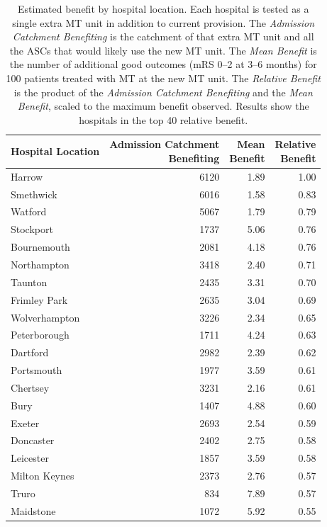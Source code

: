 \begin{table}[H]
\centering
\small
\caption{Estimated benefit by hospital location. Each hospital is tested as a single extra MT unit in addition to current provision. The \textit{Admission Catchment Benefiting} is the catchment of that extra MT unit and all the ASCs that would likely use the new MT unit. The \textit{Mean Benefit} is the number of additional good outcomes (mRS 0--2 at 3--6 months) for 100 patients treated with MT at the new MT unit. The \textit{Relative Benefit} is the product of the \textit{Admission Catchment Benefiting} and the \textit{Mean Benefit}, scaled to the maximum benefit observed. Results show the hospitals in the top 40 relative benefit.}
\label{tab:hospital-benefit}
\begin{tabular}{lrrr}
\toprule
Hospital Location & \shortstack[r]{Admission Catchment\\Benefiting} & \shortstack[r]{Mean\\Benefit} & \shortstack[r]{Relative\\Benefit} \\
\midrule
Harrow & 6120 & 1.89 & 1.00 \\
Smethwick & 6016 & 1.58 & 0.83 \\
Watford & 5067 & 1.79 & 0.79 \\
Stockport & 1737 & 5.06 & 0.76 \\
Bournemouth & 2081 & 4.18 & 0.76 \\
Northampton & 3418 & 2.40 & 0.71 \\
Taunton & 2435 & 3.31 & 0.70 \\
Frimley Park & 2635 & 3.04 & 0.69 \\
Wolverhampton & 3226 & 2.34 & 0.65 \\
Peterborough & 1711 & 4.24 & 0.63 \\
Dartford & 2982 & 2.39 & 0.62 \\
Portsmouth & 1977 & 3.59 & 0.61 \\
Chertsey & 3231 & 2.16 & 0.61 \\
Bury & 1407 & 4.88 & 0.60 \\
Exeter & 2693 & 2.54 & 0.59 \\
Doncaster & 2402 & 2.75 & 0.58 \\
Leicester & 1857 & 3.59 & 0.58 \\
Milton Keynes & 2373 & 2.76 & 0.57 \\
Truro & 834 & 7.89 & 0.57 \\
Maidstone & 1072 & 5.92 & 0.55 \\

\end{tabular}
\end{table}
